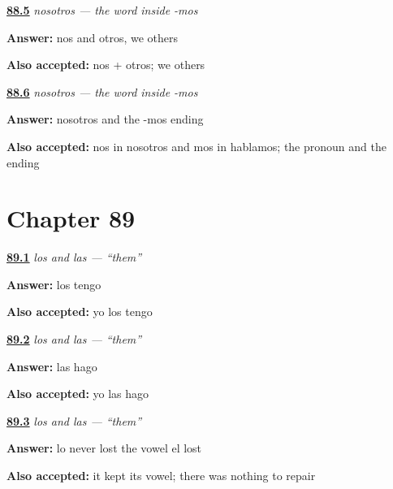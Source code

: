 \noindent\begin{minipage}[t]{\linewidth}
\raggedright
\hyperlink{review-ES-C45-nosotros-word}{\textbf{88.5}} \emph{nosotros — the word inside -mos}\par
\small \textbf{Answer:} nos and otros, we others\par
\footnotesize \textbf{Also accepted:} nos + otros; we others
\end{minipage}\par\medskip

\noindent\begin{minipage}[t]{\linewidth}
\raggedright
\hyperlink{review-ES-C45-nosotros-twice}{\textbf{88.6}} \emph{nosotros — the word inside -mos}\par
\small \textbf{Answer:} nosotros and the -mos ending\par
\footnotesize \textbf{Also accepted:} nos in nosotros and mos in hablamos; the pronoun and the ending
\end{minipage}\par\medskip

\section*{Chapter 89}

\noindent\begin{minipage}[t]{\linewidth}
\raggedright
\hyperlink{review-ES-C45-los-las-books}{\textbf{89.1}} \emph{los and las — \textquotedblleft{}them\textquotedblright{}}\par
\small \textbf{Answer:} los tengo\par
\footnotesize \textbf{Also accepted:} yo los tengo
\end{minipage}\par\medskip

\noindent\begin{minipage}[t]{\linewidth}
\raggedright
\hyperlink{review-ES-C45-los-las-meals}{\textbf{89.2}} \emph{los and las — \textquotedblleft{}them\textquotedblright{}}\par
\small \textbf{Answer:} las hago\par
\footnotesize \textbf{Also accepted:} yo las hago
\end{minipage}\par\medskip

\noindent\begin{minipage}[t]{\linewidth}
\raggedright
\hyperlink{review-ES-C45-los-las-tidy}{\textbf{89.3}} \emph{los and las — \textquotedblleft{}them\textquotedblright{}}\par
\small \textbf{Answer:} lo never lost the vowel el lost\par
\footnotesize \textbf{Also accepted:} it kept its vowel; there was nothing to repair
\end{minipage}\par\medskip

